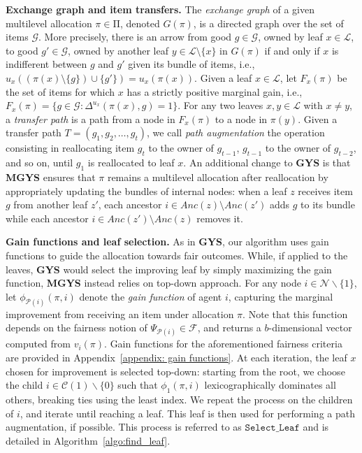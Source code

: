 \documentclass[]{article}
\newcommand{\nodes}{\mathcal{N}}
\newcommand{\items}{\mathcal{G}}
\newcommand{\children}{\mathcal{C}}
\newcommand{\parent}{\mathcal{P}}
\newcommand{\leaves}{\mathcal{L}}
\newcommand{\ancestors}{Anc}
\newcommand{\fair}{\mathcal{F}}
\newcommand{\mallocations}{\mathrm{\Pi}}
\begin{document}
\noindent \textbf{Exchange graph and item transfers.} The \emph{exchange graph} of a given multilevel allocation $\pi \in \mallocations$, denoted $G(\pi)$, is a directed graph over the set of items $\items$. More precisely, there is an arrow from good $g  \in \items$, owned by leaf $x \in \leaves$, to good $g' \in \items$, owned by another leaf $y \in \leaves \setminus \{x\}$ in $G(\pi)$ if and only if $x$ is indifferent between $g$ and $g'$ given its bundle of items, i.e., $u_x((\pi(x) \setminus \{g\}) \cup \{g'\}) = u_x(\pi(x))$. Given a leaf $x \in \leaves$, let $F_x(\pi)$ be the set of items for which $x$ has a strictly positive marginal gain, i.e., $F_x(\pi) = \{g \in \items : \Delta^{u_x}(\pi(x), g) = 1\}$. For any two leaves $x,y \in \leaves$ with $x \neq y$, a {\em transfer path} is a path from a node in $F_x(\pi)$ to a node in $\pi(y)$.  Given a transfer path $T =  (g_1, g_2, \ldots, g_t)$, we call \emph{path augmentation} the operation consisting in reallocating item $g_t$ to the owner of $g_{t-1}$, $g_{t-1}$ to the owner of $g_{t-2}$, and so on, until $g_1$ is reallocated to leaf $x$. An additional change to {\bf GYS} is that {\bf MGYS} ensures that $\pi $ remains a multilevel allocation after reallocation by appropriately updating the bundles of internal nodes: when a leaf $z$ receives item $g$ from another leaf $z'$, each ancestor $i \in \ancestors(z) \setminus \ancestors(z')$ adds $g$ to its bundle while each ancestor $i \in \ancestors(z') \setminus \ancestors(z)$ removes it.

\medskip

\noindent \textbf{Gain functions and leaf selection.} As in \textbf{GYS}, our algorithm uses gain functions to guide the allocation towards fair outcomes. While, if applied to the leaves, \textbf{GYS} would select the improving leaf by simply maximizing the gain function, {\bf MGYS} instead relies on top-down approach. 
For any node $i\in \nodes \backslash\{1\}$, let $\phi_{\parent(i)}(\pi, i)$ denote the {\em gain function} of agent $i$, capturing the marginal improvement from receiving an item under allocation $\pi $. Note that this function depends on the fairness notion of $\Psi_{\parent(i)} \in \fair$, and returns a $b$-dimensional vector computed from $v_i(\pi)$. Gain functions for the aforementioned fairness criteria are provided in Appendix~\ref{appendix: gain functions}. At each iteration, the leaf $x$ chosen for improvement is selected top-down: starting from the root, we choose the child $i \in \children(1)\backslash \{0\}$ such that $\phi_{1}(\pi, i)$ lexicographically dominates
all others, breaking ties using the least index. 
We repeat the process on the children of $i$, and iterate until reaching a leaf. This leaf is then used for performing a path augmentation, if possible. This process is referred to as $\mathtt{Select\_Leaf}$ and is detailed in Algorithm~\ref{algo:find_leaf}.
\end{document}

